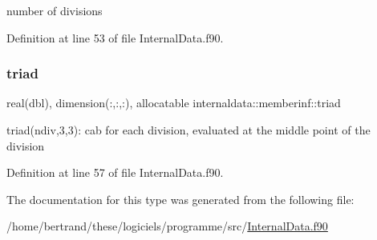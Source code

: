 number of divisions 



Definition at line 53 of file Internal\+Data.\+f90.

\mbox{\label{structinternaldata_1_1memberinf_aedb5a98d6a0011605f5458f065019a01}} 
\subsubsection{\texorpdfstring{triad}{triad}}
{\footnotesize\ttfamily real(dbl), dimension(\+:,\+:,\+:), allocatable internaldata\+::memberinf\+::triad}



triad(ndiv,3,3)\+: cab for each division, evaluated at the middle point of the division 



Definition at line 57 of file Internal\+Data.\+f90.



The documentation for this type was generated from the following file\+:\begin{DoxyCompactItemize}
\item 
/home/bertrand/these/logiciels/programme/src/\hyperlink{_internal_data_8f90}{Internal\+Data.\+f90}\end{DoxyCompactItemize}

